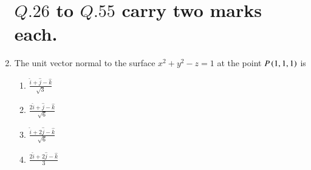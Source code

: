 \documentclass[journal,12pt,onecolumn]{IEEEtran}
\theoremstyle{remark}
\begin{document}
\begin{enumerate}[start=14]
\section{$Q.26$ to $Q.55$ carry two marks each.}
\item The unit vector normal to the surface $x^2+y^2-z=1$ at the point $P\left(1,1,1\right)$ is 
\begin{enumerate}
    \item $\frac{\hat{i}+\hat{j}-\hat{k}}{\sqrt{3}}$
    \item $\frac{2\hat{i}+\hat{j}-\hat{k}}{\sqrt{6}}$
    \item $\frac{\hat{i}+2\hat{j}-\hat{k}}{\sqrt{6}}$
    \item $\frac{2\hat{i}+2\hat{j}-\hat{k}}{3}$
\end{enumerate}

\end{enumerate}
\end{document}
